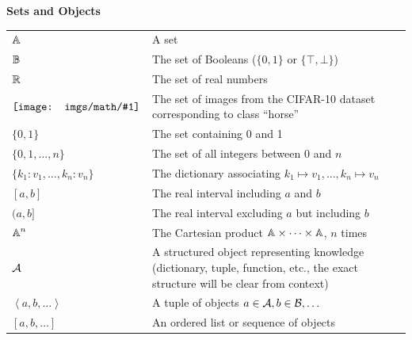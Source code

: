 \documentclass[a4paper,twoside,openright]{book}
\newcommand{\mathimg}[1]{\vcenter{\hbox{\texttt{[image: imgs/math/\#1]}}}}
\theoremstyle{plain}
\theoremstyle{definition}
\begin{document}
\centerline{\bf Sets and Objects}
\nopagebreak
\begin{tabular}{p{4cm}p{9cm}}
	$\displaystyle {\mathbb{A}}$ & A set\\
	$\displaystyle {\mathbb{B}}$ & The set of Booleans ($\{0, 1\}$ or $\{\top, \bot\}$) \\
	$\displaystyle \mathbb{R}$ & The set of real numbers \\
	$\displaystyle \mathimg{cifarhor}$ & The set of images from the CIFAR-10 dataset~\cite{krizhevsky2009learning} corresponding to class ``horse'' \\
	$\displaystyle \{0, 1\}$ & The set containing 0 and 1 \\
	$\displaystyle \{0, 1, \dots, n \}$ & The set of all integers between $0$ and $n$\\
	$\displaystyle \{k_1: v_1, \dots, k_n: v_n \}$ & The dictionary associating $k_1\mapsto v_1, \dots, k_n \mapsto v_n$\\
	$\displaystyle [a, b]$ & The real interval including $a$ and $b$\\
	$\displaystyle (a, b]$ & The real interval excluding $a$ but including $b$\\
	$\displaystyle {\mathbb{A}}^n$ & The Cartesian product ${\mathbb{A}} \times \dots \times {\mathbb{A}}$, $n$ times\\
	$\displaystyle {\mathcal{A}}$ & A structured object representing knowledge (dictionary, tuple, function, etc., the exact structure will be clear from context)\\
	$\displaystyle \left\langle a, b, \dots \right\rangle$ & A tuple of objects $a \in {\mathcal{A}}, b \in {\mathcal{B}}, \dots$\\
	$\displaystyle [a, b, \dots]$ & An ordered list or sequence of objects\\
\end{tabular}
\vspace{0.5cm}
\end{document}

